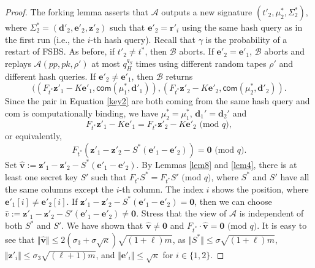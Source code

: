 \documentclass[runningheads]{llncs}
\def\cal{\mathcal}
\def\bf{\mathbf}
\begin{document}
\begin{proof}
The forking lemma \cite[Lemma 4]{PS96} asserts that $\mathcal{A}$ outputs a new signature 
$( t'_2, \mu^*_2, \Sigma_2^* )$, where $\Sigma_2^*=(\mathbf{d}'_2,\mathbf{e}'_2, \mathbf{z}'_2 )$ such that $\bf{e}'_2=\bf{r}'_i$ 
using the same hash query as in the first run (i.e., the $i$-th hash query). 
Recall that $\gamma$ is the probability of a restart of \textsf{FSBS}.
As before, if $t'_2 \neq t^*$, then $\cal{B}$  aborts. 
If $\mathbf{e}'_2 = \mathbf{e}'_1$, 
$\mathcal{B}$ aborts and replays $\mathcal{A}(pp, pk, \rho')$ at most $q_H^{q_S}$ times 
using different random tapes $\rho'$ and different hash queries. 
If $\mathbf{e}'_2 \neq \mathbf{e}'_1$, 
then $\mathcal{B}$ returns 
\begin{equation}\label{key2}
 ((F_{t^*}\mathbf{z'}_1- K\mathbf{e}'_1 , \textsf{com}(\mu^*_1, \bf{d}'_1)), ( F_{t^*}\mathbf{z'}_2- K\mathbf{e}'_2 ,\textsf{com}(\mu^*_2, \bf{d}'_2)).
 \end{equation}
Since the pair in Equation \eqref{key2} are both coming from the same hash query 
and \textsf{com} is computationally binding,  
we have $\mu^*_2=\mu^*_1$, $\bf{d}_1'=\bf{d}_2'$ and  
\[
F_{t^*}\mathbf{z'}_1- K\mathbf{e}'_1 = F_{t^*}\mathbf{z'}_2- K\mathbf{e}'_2 \text{ (mod } q),
\]
or equivalently, 
\[
F_{t^*}(\mathbf{z'}_1-\mathbf{z'}_2- S^*(\mathbf{e}'_1-\mathbf{e}'_2 ))= \textbf{0} \text{ (mod } q).
\]
Set $\widehat{\bf{v}}:=\mathbf{z'}_1-\mathbf{z'}_2- S^*(\mathbf{e}'_1-\mathbf{e}'_2 )$.  
By Lemmas \ref{lem8} and \ref{lem4}, there is at least one secret key $S'$ such that 
$F_{t^*}S^*=F_{t^*}S' \text{ (mod } q)$, where $S^*$ and $S'$ have all the same columns 
except the $i$-th column.
The index $i$ shows the position, where $\mathbf{e}'_1[i] \neq \mathbf{e}'_2[i]$. 
If $\mathbf{z'}_1-\mathbf{z'}_2- S^*(\mathbf{e}'_1-\mathbf{e}'_2 )=\mathbf{0}$,
then we can choose $\widehat{v}:=\mathbf{z'}_1-\mathbf{z'}_2- S'(\mathbf{e}'_1-\mathbf{e}'_2 ) \neq \mathbf{0}$. 
Stress that the view of $\cal{A}$ is independent of both $S^*$ and $S'$.   
We have shown that $\widehat{\bf{v}} \neq \mathbf{0}$ and $F_{t^*}\cdot \widehat{\bf{v}} = \textbf{0} \text{ (mod } q)$.
 It is easy to see that $\Vert \widehat{\bf{v}}\Vert \leq 2(\sigma_3+\sigma\sqrt{\kappa})\sqrt{(1+\ell)m}$, 
 as   $\Vert S^*\Vert\leq \sigma\sqrt{(1+\ell)m}$, $\Vert \mathbf{z}'_{i}\Vert\leq \sigma_3\sqrt{(\ell+1)m}$, and $\Vert \mathbf{e}'_{i}\Vert\leq \sqrt{\kappa}$ for $i \in \{1,2\}$. 


\end{proof}
\end{document}
